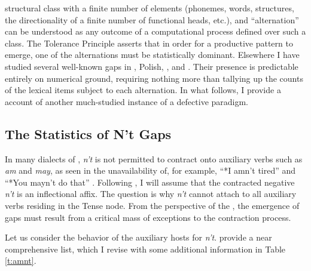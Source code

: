 \documentclass[output=paper,
modfonts
]{LSP/langsci}
\begin{document}
structural class with a finite number of  elements (phonemes, words,
 structures, the directionality of a finite number of
functional heads, etc.), and ``alternation'' can be understood as any
outcome of a computational process defined over such a class. The Tolerance
Principle asserts that in order for a productive pattern to emerge,
one of the alternations must be statistically dominant. Elsewhere 
 I have studied  several well-known gaps in ,
Polish, , and  \citep[][Chapter 5]{POP}. Their presence is
predictable entirely on numerical ground, requiring nothing more than
tallying up the counts of the lexical items subject to each
alternation. 
In what follows, I  provide a  account of 
another much-studied instance of a defective paradigm. 

\subsection{The Statistics of  N't Gaps}

In many dialects 
of , \emph{n't} is not permitted to contract onto 
auxiliary verbs such as \emph{am} and \emph{may}, as seen in the unavailability of, for
example, ``*I amn't tired'' and ``*You mayn't do that''
\citep[e.g.,][]{Anderwald2003, 
  Bresnan2001HB, Broadbent2009, Frampton2001,Hudson2000,Zwicky1983a}. 
Following \citet{Zwicky1983a}, I will  assume that the contracted
negative \emph{n't}  is an inflectional affix. The question 
is why \emph{n't} cannot attach to all auxiliary verbs residing
in the Tense node.
From the perspective of the , the emergence of gaps
must result from a critical mass of  exceptions to the contraction
process.   

Let us consider the behavior of the auxiliary hosts for \emph{n't}. 
\citet[][ p508]{Zwicky1983a}  provide  a near comprehensive list,
which I revise with some additional information in Table 
\ref{t:amnt}. 
\end{document}
